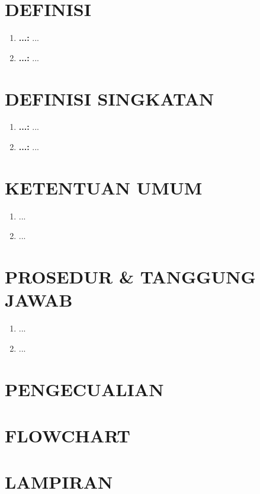 \documentclass[12pt]{sop}
\begin{document}
    \section{DEFINISI}
    \begin{enumerate}
        \item \textbf{...:} ...
        \item \textbf{...:} ...
    \end{enumerate}

    \section{DEFINISI SINGKATAN}
    \begin{enumerate}
        \item \textbf{...:} ...
        \item \textbf{...:} ...
    \end{enumerate}

    \section{KETENTUAN UMUM}
    \begin{enumerate}
        \item ...
        \item ...
    \end{enumerate}

    \section{PROSEDUR \& TANGGUNG JAWAB}
    \begin{enumerate}
        \item ...
        \item ...
    \end{enumerate}

    \section{PENGECUALIAN}
    \section{FLOWCHART}
    \section{LAMPIRAN}
\end{document}

